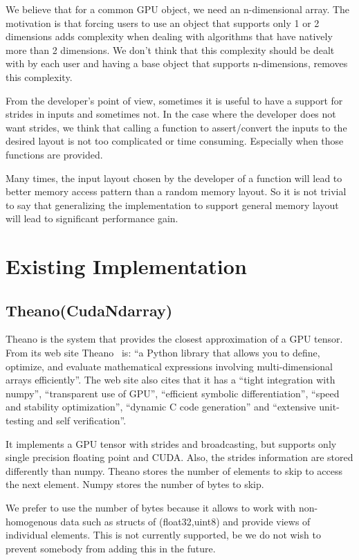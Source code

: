 \documentclass{article} %
\begin{document}
We believe that for a common GPU object, we need an n-dimensional
array. The motivation is that forcing users to use an object that
supports only 1 or 2 dimensions adds complexity when dealing with algorithms that have natively more than 2 dimensions.
We don't think that this complexity should be dealt with by each user and 
having a base object that supports n-dimensions, removes
this complexity.

From the developer's point of view, sometimes it is useful to have a support for
strides in inputs and sometimes not. In the case where the developer does not want strides, we think
that calling a function to assert/convert the inputs to the desired layout is not too complicated or time consuming.
Especially when those functions are provided.

Many times, the input layout chosen by the developer of a function
will lead to better memory access pattern than a random memory
layout. So it is not trivial to say that generalizing the
implementation to support general memory layout will lead to
significant performance gain. 

\section{Existing Implementation}
\subsection{Theano(CudaNdarray)}
Theano is the system that provides the closest approximation of a GPU tensor. From its web site Theano~\citep{bergstra+al:2010-scipy} is:
``a Python library that allows you to define, optimize, and evaluate mathematical expressions involving multi-dimensional arrays efficiently''. The web site also cites that it has a ``tight integration with numpy'', ``transparent use of GPU'', ``efficient symbolic differentiation'', ``speed and stability optimization'', ``dynamic C code generation'' and ``extensive unit-testing and self verification''.

It implements a GPU tensor with strides and broadcasting, but supports only single precision floating point and CUDA. Also, the strides information are stored differently than numpy. Theano stores the number of elements to skip to access the next element. Numpy stores the number of bytes to skip.

We prefer to use the number of bytes because it allows to work with non-homogenous data such as structs of (float32,uint8) and provide views of individual elements.  This is not currently supported, be we do not wish to prevent somebody from adding this in the future.
\end{document}
